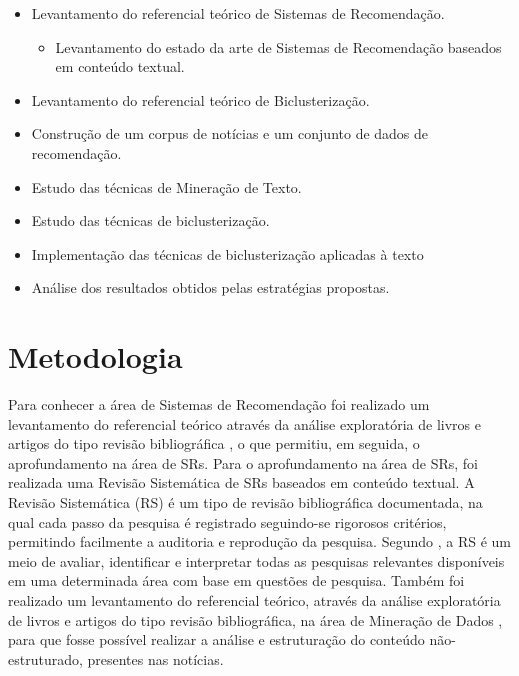 \documentclass[normaltoc, espacoumemeio, pnumromarab,ruledheader]{abnt}
\begin{document}
\begin{itemize}
  \item Levantamento do referencial teórico de Sistemas de Recomendação.
  \begin{itemize}
    \item Levantamento do estado da arte de Sistemas de Recomendação baseados em conteúdo textual.
  \end{itemize}
  \item Levantamento do referencial teórico de Biclusterização.
  \item Construção de um corpus de notícias e um conjunto de dados de recomendação.
  \item Estudo das técnicas de Mineração de Texto.
  \item Estudo das técnicas de biclusterização.
  \item Implementação das técnicas de biclusterização aplicadas à texto
  \item Análise dos resultados obtidos pelas estratégias propostas.
\end{itemize}

\section{Metodologia}


Para conhecer a área de Sistemas de Recomendação foi realizado um levantamento do referencial teórico através da análise exploratória de livros e artigos do tipo revisão bibliográfica \cite{Adomavicius2005,Lops2011,Ricci2011,Ricci22011,Jannach2011,Burke2002}, o que permitiu, em seguida, o aprofundamento na área de SRs.
Para o aprofundamento na área de SRs, foi realizada uma Revisão Sistemática de SRs baseados em conteúdo textual.
A Revisão Sistemática (RS) é um tipo de revisão bibliográfica documentada, na qual cada passo da pesquisa é registrado seguindo-se rigorosos critérios, permitindo facilmente a auditoria e reprodução da pesquisa.
Segundo , a RS é um meio de avaliar, identificar e interpretar todas as pesquisas relevantes disponíveis em uma determinada área com base em questões de pesquisa.
Também foi realizado um levantamento do referencial teórico, através da análise exploratória de livros e artigos do tipo revisão bibliográfica, na área de Mineração de Dados \cite{Berry2010,Feldman2006,Miner2012,Hotho2005,Weiss2010}, para que fosse possível realizar a análise e estruturação do conteúdo não-estruturado, presentes nas notícias.
\end{document}
